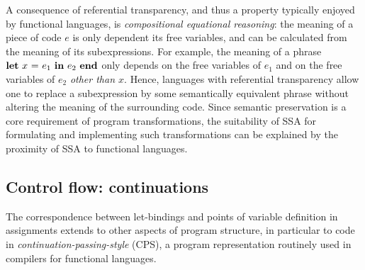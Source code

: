 {A consequence of referential transparency, and thus a property
typically enjoyed by functional languages, is \emph{compositional
equational reasoning}: the meaning of a piece of code $e$ is only
dependent its free variables, and can be calculated from the meaning
of its subexpressions. For example, the meaning of a phrase $\mathbf{let}\ {x}\ \mathbf{=}\ {e_1}\ \mathbf{in}\ {e_2}\ \mathbf{end}$ only depends on the free variables of $e_1$ and on the
free variables of $e_2$ \emph{other than $x$}. Hence, languages with
referential transparency allow one to replace a subexpression by some
semantically equivalent phrase without altering the meaning of the
surrounding code. Since semantic preservation is a core requirement of
program transformations, the suitability of SSA for formulating and
implementing such transformations can be explained by the proximity of
SSA to functional languages.

\subsection{Control flow: continuations}
\label{section:Part1:Semantics:Continuations}
The correspondence between let-bindings and points of variable
definition in assignments extends to other aspects of program
structure, in particular to code in
\emph{continuation-passing-style} (CPS), a program
representation routinely used in compilers for functional languages.


}
